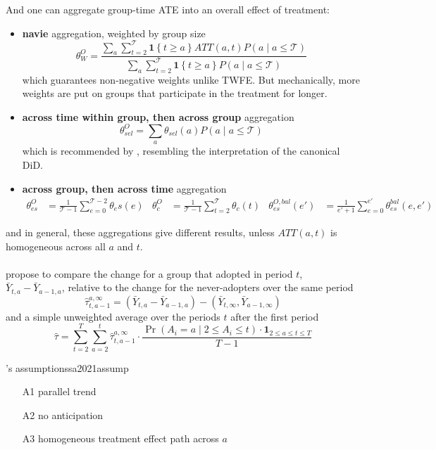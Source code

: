 \documentclass[twoside]{article}
\begin{document}
And one can aggregate group-time ATE into an overall effect of treatment:
\begin{itemize}
    \item \textbf{navie} aggregation, weighted by group size $$ \theta_W^O = \frac{ \sum_a\sum^{\mathcal{T}}_{t=2}\mathbf{1}\left\{t\geq a\right\} ATT(a,t)P(a\mid a\leq \mathcal{T}) }{ \sum_a\sum^{\mathcal{T}}_{t=2}\mathbf{1}\left\{t\geq a\right\} P(a\mid a\leq \mathcal{T}) } $$ which guarantees non-negative weights unlike TWFE. But mechanically, more weights are put on groups that participate in the treatment for longer.
    \item \textbf{across time within group, then across group} aggregation $$ \theta^O_{sel} = \sum_a\theta_{sel}(a) P(a\mid  a\leq \mathcal{T}) $$ which is recommended by \citet{callaway2021difference}, resembling the interpretation of the canonical DiD.
    \item \textbf{across group, then across time} aggregation
    \begin{align*}
        \theta^O_{es} &= \frac{1}{\mathcal{T}-1}\sum^{\mathcal{T}-2}_{e=0}\theta_es(e) & \theta^O_{c} &= \frac{1}{\mathcal{T}-1}\sum^{\mathcal{T}}_{t=2}\theta_c(t) & \theta^{O,bal}_{es}(e') &= \frac{1}{e'+1}\sum^{e'}_{e=0}\theta^{bal}_{es}(e,e')
    \end{align*}
\end{itemize}
and in general, these aggregations give different results, unless $ATT(a,t)$ is homogeneous across all $a$ and $t$.

\paragraph*{\citet{sun2021estimating}}

\citet{sun2021estimating} propose to compare the change for a group that adopted in period $t$, $\bar{Y}_{t,a}-\bar{Y}_{a-1,a}$, relative to the change for the never-adopters over the same period 
$$ \hat{\tau}^{a,\infty}_{t,a-1} = \left(\bar{Y}_{t,a}-\bar{Y}_{a-1,a}\right) - \left(\bar{Y}_{t,\infty},\bar{Y}_{a-1,\infty}\right) $$
and a simple unweighted average over the periods $t$ after the first period
$$ \hat{\tau} = \sum^T_{t=2}\sum^t_{a=2}\hat{\tau}^{a,\infty}_{t,a-1} \cdot \frac{\Pr \left(A_i=a\mid 2\leq A_i \leq t\right)\cdot \mathbf{1}_{2\leq a\leq t\leq T} }{T-1} $$

\begin{assumption}{\citet{sun2021estimating}'s assumptions}{sa2021assump}
    \begin{itemize}
        \item[A1] parallel trend
        \item[A2] no anticipation
        \item[A3] homogeneous treatment effect path across $a$   
    \end{itemize}
\end{assumption}
\end{document}
